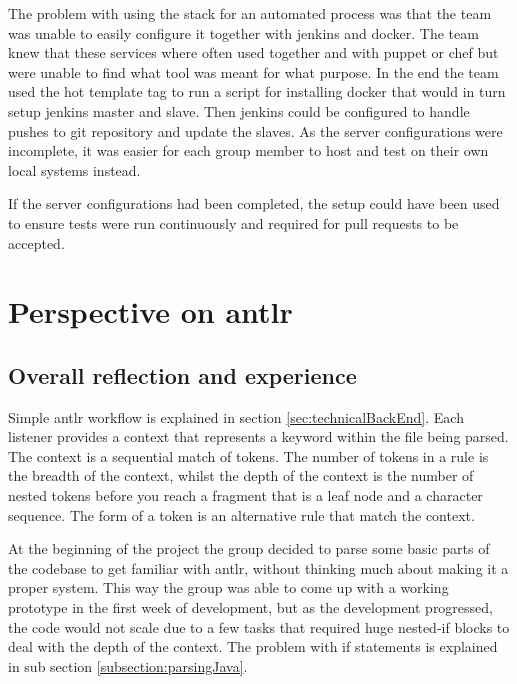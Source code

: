 

The problem with using the stack for an automated process was that the team was unable to easily configure it together with \gls{jenkins} and \gls{docker}. The team knew that these services where often used together and with \gls{puppet} or \gls{chef} but were unable to find what tool was meant for what purpose. In the end the team used the \gls{hot} template tag to run a script for installing docker that would in turn setup \gls{jenkins} master and slave. Then \gls{jenkins} could be configured to handle pushes to \gls{git} repository and update the slaves. As the server configurations were incomplete, it was easier for each group member to host and test on their own local systems instead.

If the server configurations had been completed, the setup could have been used to ensure tests were run continuously and required for pull requests to be accepted. 

\section{Perspective on antlr}
\subsection{Overall reflection and experience}
Simple \Gls{antlr} workflow is explained in section \ref{sec:technicalBackEnd}. Each listener provides a context that represents a keyword within the file being parsed. The context is a sequential match of tokens. The number of tokens in a rule is the breadth of the context, whilst the depth of the context is the number of nested tokens before you reach a fragment that is a leaf node and a character sequence. The form of a token is an alternative rule that match the context.  

At the beginning of the project the group decided to parse some basic parts of the codebase to get familiar with \gls{antlr}, without thinking much about making it a proper system. This way the group was able to come up with a working prototype in the first week of development, but as the development progressed, the code would not scale due to a few tasks that required huge nested-if blocks to deal with the depth of the context. The problem with if statements is explained in sub section \ref{subsection:parsingJava}.

